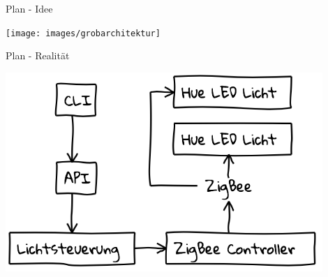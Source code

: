 \begin{frame}{Plan - Idee}
  \begin{center}
    \texttt{[image: images/grobarchitektur]}
  \end{center}
\end{frame}

\begin{frame}{Plan - Realität}
  \begin{center}
    \includegraphics[width=0.9\textwidth]{images/realworld}
  \end{center}
\end{frame}